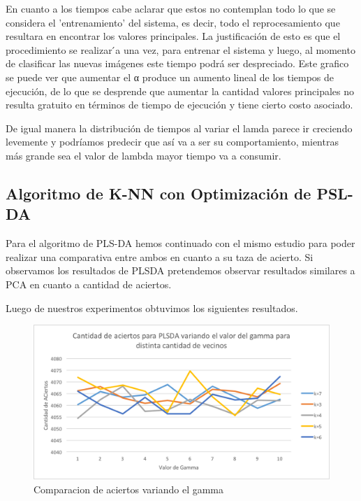 En cuanto a los tiempos cabe aclarar que estos no contemplan todo lo que se considera el ’entrenamiento’ del sistema, es decir, todo el reprocesamiento que resultara en encontrar
los valores principales. La justificación de esto es que el procedimiento se realizar ́a una vez, para entrenar el sistema y luego, al momento de clasificar las
nuevas imágenes este tiempo podrá ser despreciado. Este grafico se puede ver que aumentar el α produce un aumento lineal de los tiempos de ejecución, 
de lo que se desprende que aumentar la cantidad valores principales no resulta gratuito en términos de tiempo de ejecución y tiene cierto costo asociado.

De igual manera la distribución de tiempos al variar el lamda parece ir creciendo levemente y podríamos predecir que así va a ser su comportamiento, mientras más grande sea el valor de lambda mayor tiempo va a consumir.

\subsection {Algoritmo de K-NN con Optimización de PSL-DA}

Para el algoritmo de PLS-DA hemos continuado con el mismo estudio para poder realizar una comparativa entre ambos en cuanto a su taza de acierto. Si observamos los resultados de PLSDA pretendemos observar resultados similares a PCA en cuanto a cantidad de aciertos. 

Luego de nuestros experimentos obtuvimos los siguientes resultados.

\begin{figure}[H]
\centering
\includegraphics[width=1\textwidth]{imagenes/AciertosPLSDA.png}
\caption{Comparacion de aciertos variando el gamma}
\label{fig:Comparacion de tecnicas}
\end{figure}

